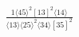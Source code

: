 \documentclass[varwidth, border=5pt]{standalone}
\begin{document}
\begin{my}
$\begin{gathered}
\scriptscriptstyle\frac{1⟨45⟩^2[13]^2⟨14⟩}{⟨13⟩⟨25⟩^2⟨34⟩[35]^2}
\end{gathered}$
\end{my}
\end{document}
